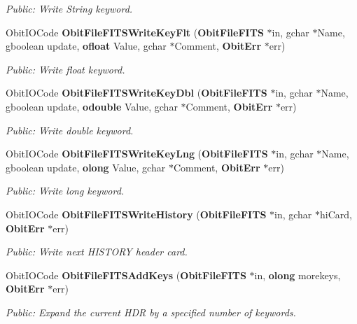 \begin{CompactItemize}
\begin{CompactList}\small\item\em Public: Write String keyword. \item\end{CompactList}\item 
Obit\-IOCode {\bf Obit\-File\-FITSWrite\-Key\-Flt} ({\bf Obit\-File\-FITS} $\ast$in, gchar $\ast$Name, gboolean update, {\bf ofloat} Value, gchar $\ast$Comment, {\bf Obit\-Err} $\ast$err)
\begin{CompactList}\small\item\em Public: Write float keyword. \item\end{CompactList}\item 
Obit\-IOCode {\bf Obit\-File\-FITSWrite\-Key\-Dbl} ({\bf Obit\-File\-FITS} $\ast$in, gchar $\ast$Name, gboolean update, {\bf odouble} Value, gchar $\ast$Comment, {\bf Obit\-Err} $\ast$err)
\begin{CompactList}\small\item\em Public: Write double keyword. \item\end{CompactList}\item 
Obit\-IOCode {\bf Obit\-File\-FITSWrite\-Key\-Lng} ({\bf Obit\-File\-FITS} $\ast$in, gchar $\ast$Name, gboolean update, {\bf olong} Value, gchar $\ast$Comment, {\bf Obit\-Err} $\ast$err)
\begin{CompactList}\small\item\em Public: Write long keyword. \item\end{CompactList}\item 
Obit\-IOCode {\bf Obit\-File\-FITSWrite\-History} ({\bf Obit\-File\-FITS} $\ast$in, gchar $\ast$hi\-Card, {\bf Obit\-Err} $\ast$err)
\begin{CompactList}\small\item\em Public: Write next HISTORY header card. \item\end{CompactList}\item 
Obit\-IOCode {\bf Obit\-File\-FITSAdd\-Keys} ({\bf Obit\-File\-FITS} $\ast$in, {\bf olong} morekeys, {\bf Obit\-Err} $\ast$err)
\begin{CompactList}\small\item\em Public: Expand the current HDR by a specified number of keywords. \item\end{CompactList}\item 

\end{CompactItemize}
